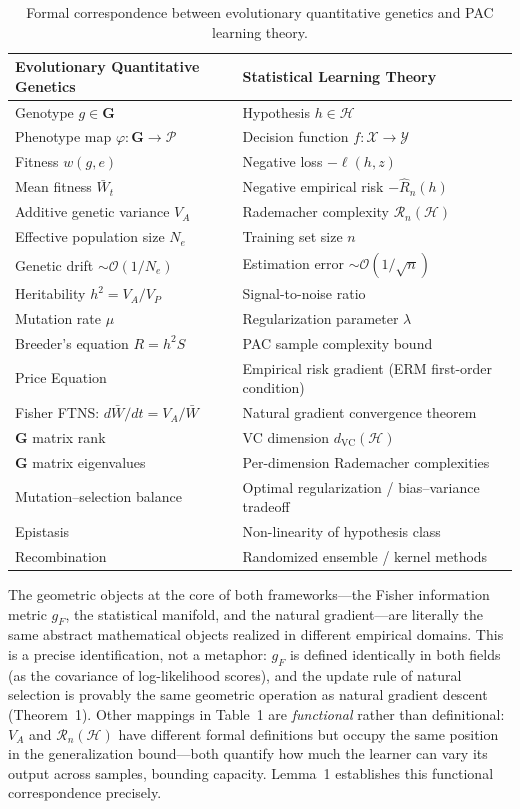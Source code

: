 \documentclass[12pt]{article}
\theoremstyle{remark}
\begin{document}
\begin{table}[ht]
\centering
\caption{Formal correspondence between evolutionary quantitative genetics and PAC learning theory.}
\label{tab:correspondence}
\begin{tabular}{@{}ll@{}}
\toprule
\textbf{Evolutionary Quantitative Genetics} & \textbf{Statistical Learning Theory} \\
\midrule
Genotype $g \in \mathbf{G}$ & Hypothesis $h \in \mathcal{H}$ \\
Phenotype map $\varphi: \mathbf{G} \to \mathcal{P}$ & Decision function $f: \mathcal{X} \to \mathcal{Y}$ \\
Fitness $w(g, e)$ & Negative loss $-\ell(h, z)$ \\
Mean fitness $\bar{W}_t$ & Negative empirical risk $-\hat{R}_n(h)$ \\
Additive genetic variance $V_A$ & Rademacher complexity $\mathcal{R}_n(\mathcal{H})$ \\
Effective population size $N_e$ & Training set size $n$ \\
Genetic drift $\sim \mathcal{O}(1/N_e)$ & Estimation error $\sim \mathcal{O}(1/\sqrt{n})$ \\
Heritability $h^2 = V_A / V_P$ & Signal-to-noise ratio \\
Mutation rate $\mu$ & Regularization parameter $\lambda$ \\
Breeder's equation $R = h^2 S$ & PAC sample complexity bound \\
Price Equation & Empirical risk gradient (ERM first-order condition) \\
Fisher FTNS: $d\bar{W}/dt = V_A/\bar{W}$ & Natural gradient convergence theorem \\
$\mathbf{G}$ matrix rank & VC dimension $d_{\mathrm{VC}}(\mathcal{H})$ \\
$\mathbf{G}$ matrix eigenvalues & Per-dimension Rademacher complexities \\
Mutation--selection balance & Optimal regularization / bias--variance tradeoff \\
Epistasis & Non-linearity of hypothesis class \\
Recombination & Randomized ensemble / kernel methods \\
\bottomrule
\end{tabular}
\end{table}

The geometric objects at the core of both frameworks---the Fisher information metric $g_F$, the statistical manifold, and the natural gradient---are literally the same abstract mathematical objects realized in different empirical domains. This is a precise identification, not a metaphor: $g_F$ is defined identically in both fields (as the covariance of log-likelihood scores), and the update rule of natural selection is provably the same geometric operation as natural gradient descent (Theorem~1). Other mappings in Table~1 are \emph{functional} rather than definitional: $V_A$ and $\mathcal{R}_n(\mathcal{H})$ have different formal definitions but occupy the same position in the generalization bound---both quantify how much the learner can vary its output across samples, bounding capacity. Lemma~1 establishes this functional correspondence precisely.
\end{document}
